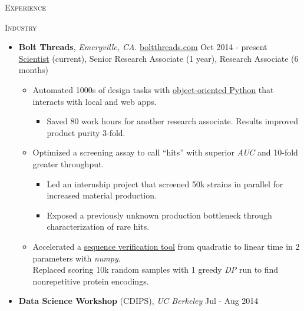 \documentclass[10pt,letterpaper]{article}
\begin{document}
{\Large\textsc{Experience}} \smallbreak
\begin{minipage}{0.05\textwidth}
    \begin{sideways}\textsc{Industry}\end{sideways}
\end{minipage}
\begin{minipage}{0.95\textwidth}
    \begin{itemize}
        \item \textbf{Bolt Threads}, \emph{Emeryville, CA}. \href{http://www.boltthreads.com}{boltthreads.com} \hfill{Oct 2014 - present}\\
              \underline{Scientist} (current), Senior Research Associate (1 year), Research Associate (6 months)
              \begin{itemize}
                   \item Automated 1000s of design tasks with \href{http://www.github.com/thomasvstevens/delta-design}{object-oriented Python} that interacts with local and web apps.
                         \begin{itemize}[leftmargin=1.5em,itemsep=0em,parsep=0em]
                         \item Saved 80 work hours for another research associate. Results improved product purity 3-fold. 
                         \end{itemize}
                   \item Optimized a screening assay to call ``hits'' with superior \emph{AUC} and 10-fold greater throughput.
                         \begin{itemize}[leftmargin=1.5em,itemsep=0em,parsep=0em]
                         \item Led an internship project that screened 50k strains in parallel for increased material production.
                         \item Exposed a previously unknown production bottleneck through characterization of rare hits.
                         \end{itemize}
                   \item Accelerated a \href{http://www.github.com/thomasvstevens/seq-tools}{sequence verification tool} from quadratic to linear time in 2 parameters with \emph{numpy}. \\
                         Replaced scoring 10k random samples with 1 greedy \emph{DP} run to find nonrepetitive protein encodings.
              \end{itemize}
        \item \textbf{Data Science Workshop} (CDIPS), \emph{UC Berkeley} \hfill{Jul - Aug 2014}

\end{itemize}
\end{minipage}
\end{document}
